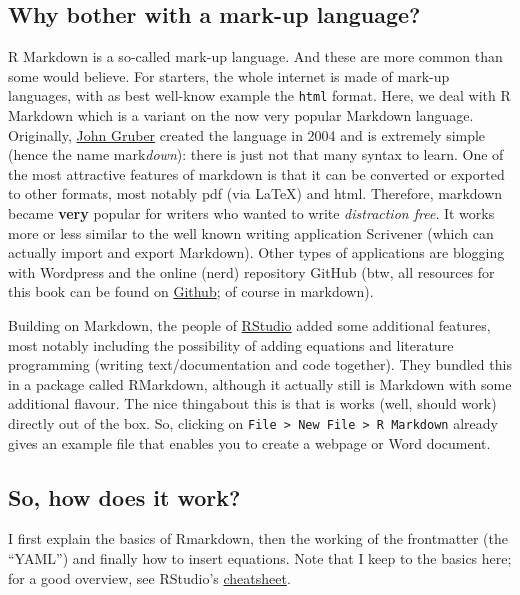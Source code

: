 \documentclass[]{article}
\theoremstyle{definition}
\theoremstyle{definition}
\theoremstyle{definition}
\theoremstyle{remark}
\begin{document}
\subsection{Why bother with a mark-up
language?}\label{why-bother-with-a-mark-up-language}

R Markdown is a so-called mark-up language. And these are more common
than some would believe. For starters, the whole internet is made of
mark-up languages, with as best well-know example the \texttt{html}
format. Here, we deal with R Markdown which is a variant on the now very
popular Markdown language. Originally,
\href{https://daringfireball.net/projects/markdown/syntax}{John Gruber}
created the language in 2004 and is extremely simple (hence the name
mark\emph{down}): there is just not that many syntax to learn. One of
the most attractive features of markdown is that it can be converted or
exported to other formats, most notably pdf (via LaTeX) and html.
Therefore, markdown became \textbf{very} popular for writers who wanted
to write \emph{distraction free}. It works more or less similar to the
well known writing application Scrivener (which can actually import and
export Markdown). Other types of applications are blogging with
Wordpress and the online (nerd) repository GitHub (btw, all resources
for this book can be found on
\href{https://github.com/Thdegraaff/ResearchTools}{Github}; of course in
markdown).

Building on Markdown, the people of
\href{http://rmarkdown.rstudio.com}{RStudio} added some additional
features, most notably including the possibility of adding equations and
literature programming (writing text/documentation and code together).
They bundled this in a package called RMarkdown, although it actually
still is Markdown with some additional flavour. The nice thingabout this
is that is works (well, should work) directly out of the box. So,
clicking on
\texttt{File\ \textgreater{}\ New\ File\ \textgreater{}\ R\ Markdown}
already gives an example file that enables you to create a webpage or
Word document.

\subsection{So, how does it work?}\label{so-how-does-it-work}

I first explain the basics of Rmarkdown, then the working of the
frontmatter (the ``YAML'') and finally how to insert equations. Note
that I keep to the basics here; for a good overview, see RStudio's
\href{https://www.rstudio.com/wp-content/uploads/2016/03/rmarkdown-cheatsheet-2.0.pdf}{cheatsheet}.
\end{document}
